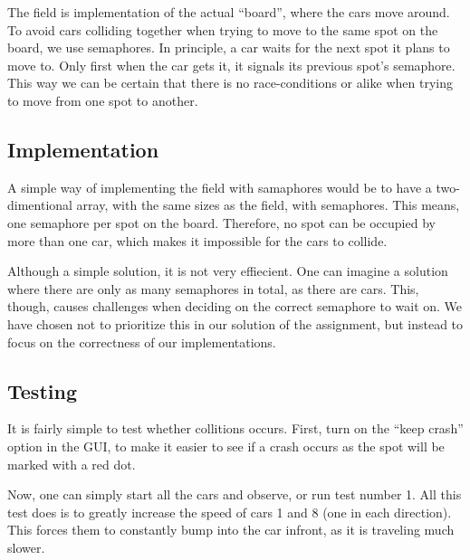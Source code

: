 
The field is implementation of the actual ``board'', where the cars move
around. To avoid cars colliding together when trying to move to the
same spot on the board, we use semaphores. In principle, a car waits
for the next spot it plans to move to. Only first when the car gets
it, it signals its previous spot's semaphore. This way we can be
certain that there is no race-conditions or alike when trying to move
from one spot to another.


\subsection{Implementation}
\label{sub:field-impl}
A simple way of implementing the field with samaphores would be to
have a two-dimentional array, with the same sizes as the field, with
semaphores. This means, one semaphore per spot on the
board. Therefore, no spot can be occupied by more than one car, which
makes it impossible for the cars to collide.

Although a simple solution, it is not very effiecient. One can imagine
a solution where there are only as many semaphores in total, as there
are cars. This, though, causes challenges when deciding on the
correct semaphore to wait on. We have chosen not to
prioritize this in our solution of the assignment, but instead to focus on the correctness of our implementations.


\subsection{Testing}
\label{sub:field-test}
It is fairly simple to test whether collitions occurs. First, turn on
the ``keep crash'' option in the GUI, to make it easier to see if a
crash occurs as the spot will be marked with a red dot.

Now, one can simply start all the cars and observe, or run test number
1. All this test does is to greatly increase the speed of cars 1 and 8
(one in each direction). This forces them to constantly bump into the
car infront, as it is traveling much slower.
